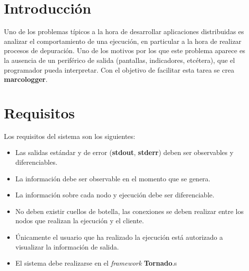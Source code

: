 \documentclass{article}
\title{\hmwkTitle}
\author{\textbf{\hmwkAuthorName}}
\date{\hmwkDueDate}
\begin{document}
\maketitle
\begin{abstract}
Marcologger es una herramienta que permite observar la salida de un programa distribuido desde una única interfaz, integrándose además en rsyslog, utilizando Snorky para la gestión de los WebSockets.
\end{abstract}


\setcounter{tocdepth}{1}

\tableofcontents
\newpage

\section{Introducción}

Uno de los problemas típicos a la hora de desarrollar aplicaciones distribuidas es analizar el comportamiento de una ejecución, en particular a la hora de realizar procesos de depuración. Uno de los motivos por los que este problema aparece es la ausencia de un periférico de salida (pantallas, indicadores, etcétera), que el programador pueda interpretar. Con el objetivo de facilitar esta tarea se crea \textbf{marcologger}. 

\section{Requisitos}

Los requisitos del sistema son los siguientes:

\begin{itemize}
	\item Las salidas estándar y de error (\textbf{stdout}, \textbf{stderr}) deben ser observables y diferenciables.
	\item La información debe ser observable en el momento que se genera.
	\item La información sobre cada nodo y ejecución debe ser diferenciable.
	\item No deben existir cuellos de botella, las conexiones se deben realizar entre los nodos que realizan la ejecución y el cliente.
	\item Únicamente el usuario que ha realizado la ejecución está autorizado a visualizar la información de salida.
	\item El sistema debe realizarse en el \textit{framework} \textbf{Tornado}.s
\end{itemize}
\end{document}
